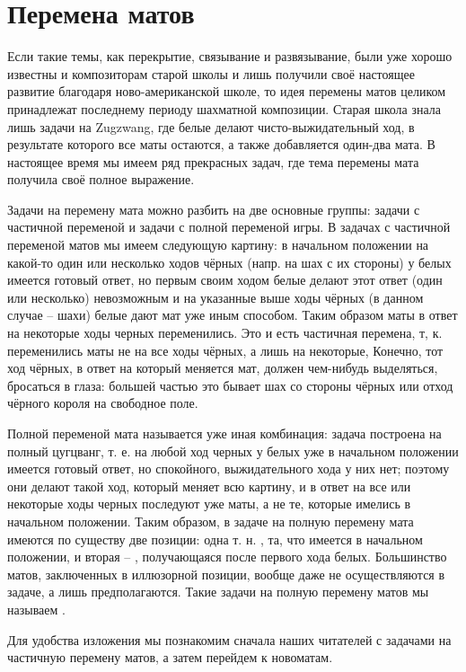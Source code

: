 \chapter{Перемена матов}

Если такие темы, как перекрытие, связывание и развязывание, были уже хорошо известны и композиторам старой
 школы и лишь получили своё настоящее развитие благодаря ново-американской школе, то идея перемены матов 
 целиком принадлежат последнему периоду шахматной композиции. Старая школа знала лишь задачи на Zugzwang, 
 где белые делают чисто-выжидательный ход, в результате которого все маты остаются, а также добавляется 
 один-два мата. В настоящее время мы имеем ряд прекрасных задач, где тема перемены мата получила своё 
 полное выражение.

Задачи на перемену мата можно разбить на две основные группы: задачи с частичной переменой и задачи с 
полной переменой игры. В задачах с частичной переменой матов мы имеем следующую картину: в начальном 
положении на какой-то один или несколько ходов чёрных (напр. на шах с их стороны) у белых имеется готовый 
ответ, но первым своим ходом белые делают этот ответ (один или несколько) невозможным и на указанные выше 
ходы чёрных (в данном случае -- шахи) белые дают мат уже иным способом. Таким образом маты в ответ на 
некоторые ходы черных переменились. Это и есть частичная перемена, т, к. переменились маты не на все ходы 
чёрных, а лишь на некоторые, Конечно, тот ход чёрных, в ответ на который меняется мат, должен чем-нибудь 
выделяться, бросаться в глаза: большей частью это бывает шах со стороны чёрных или отход чёрного короля на 
свободное поле.

Полной переменой мата называется уже иная комбинация: задача построена на полный цугцванг, т. е. на любой 
ход черных у белых уже в начальном положении имеется готовый ответ, но спокойного, выжидательного хода у 
них нет; поэтому они делают такой ход, который меняет всю картину, и в ответ на все или некоторые ходы 
черных последуют уже  маты, а не те, которые имелись в начальном положении. Таким образом, в 
задаче на полную перемену мата имеются по существу две позиции: одна т. н. , та, что 
имеется в начальном положении, и вторая -- , получающаяся после первого хода белых. 
Большинство матов, заключенных в иллюзорной позиции, вообще даже не осуществляются в задаче, а лишь 
предполагаются. Такие задачи на полную перемену матов мы называем .

Для удобства изложения мы познакомим сначала наших читателей с задачами на частичную перемену матов, а 
затем перейдем к новоматам.

